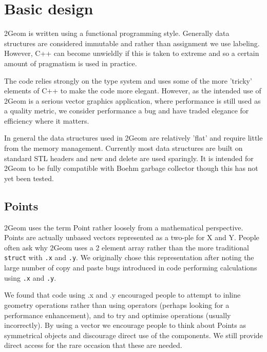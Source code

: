 


\chapter{Basic design}

2Geom is written using a functional programming style\cite{}.
Generally data structures are considered immutable and rather than
assignment we use labeling.  However, C++ can become unwieldly if this
is taken to extreme and so a certain amount of pragmatism is used in
practice.

The code relies strongly on the type system and uses some of the more
'tricky' elements of C++ to make the code more elegant.  However, as
the intended use of 2Geom is a serious vector graphics application,
where performance is still used as a quality metric, we consider
performance a bug and have traded elegance for efficiency where it
matters.

In general the data structures used in 2Geom are relatively 'flat' and
require little from the memory management.  Currently most data
structures are built on standard STL headers\cite{stl} and new and
delete are used sparingly.  It is intended for 2Geom to be fully
compatible with Boehm garbage collector\cite{boehm} though this has
not yet been tested.

\section{Points}

2Geom uses the term Point rather loosely from a mathematical
perspective.  Points are actually unbased vectors represented as a
two-ple for X and Y.  People often ask why 2Geom uses a 2 element
array rather than the more traditional \verb|struct| with \verb|.x|
and \verb|.y|.  We originally chose this representation after noting
the large number of copy and paste bugs introduced in code performing
calculations using \verb|.x| and \verb|.y|.

We found that code using .x and .y encouraged people to attempt to
inline geometry operations rather than using operators (perhaps
looking for a performance enhancement), and to try and optimise
operations (usually incorrectly).  By using a vector we encourage
people to think about Points as symmetrical objects and discourage
direct use of the components.  We still provide direct access for the
rare occasion that these are needed.

